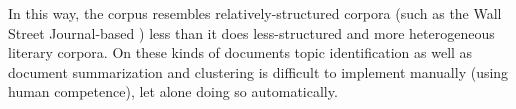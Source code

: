 In this way, the corpus resembles relatively-structured corpora (such as the Wall Street Journal-based ) less than it does less-structured and more heterogeneous literary corpora. On these kinds of documents topic identification as well as document summarization and clustering is difficult to implement manually (using human competence), let alone doing so automatically.
